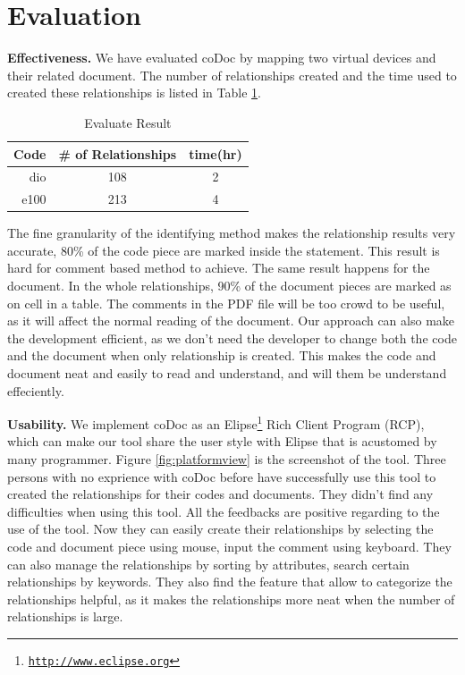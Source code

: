 \documentclass[11pt,letterpaper,oneside]{article}
\begin{document}
\section{Evaluation}
\label{sec:evaluation}
\textbf{Effectiveness.} We have evaluated coDoc by mapping two virtual devices and their related document.
The number of relationships created and the time used to created these relationships is listed in Table \ref{table:evaluate}.

\begin{table}[th]
\caption{Evaluate Result}
\centering
\begin{tabular}{rcc}
\hline
Code & \# of Relationships & time(hr) \\
\hline
dio & 108 & 2 \\
e100  & 213 & 4\\
\hline
\end{tabular}
\label{table:evaluate}
\end{table}

The fine granularity of the identifying method makes the relationship results very accurate, 
80\% of the code piece are marked inside the statement.
This result is hard for comment based method to achieve.
The same result happens for the document.
In the whole relationships, 
90\% of the document pieces are marked as on cell in a table.
The comments in the PDF file will be too crowd to be useful,
as it will affect the normal reading of the document.
Our approach can also make the development efficient,
as we don't need the developer to change both the code and the document when only relationship is created.
This makes the code and document neat and easily to read and understand,
and will them be understand effeciently.

\noindent \textbf{Usability.} We implement coDoc as an Elipse\footnote{\texttt{\url{http://www.eclipse.org}}} Rich Client Program (RCP), 
which can make our tool share the user style with Elipse that is acustomed by many programmer.
Figure \ref{fig:platformview} is the screenshot of the tool.
Three persons with no exprience with coDoc before have successfully use this tool to created the relationships for their codes and documents.
They didn't find any difficulties when using this tool.
All the feedbacks are positive regarding to the use of the tool.
Now they can easily create their relationships by selecting the code and document piece using mouse, input the comment using keyboard.
They can also manage the relationships by sorting by attributes, search certain relationships by keywords.
They also find the feature that allow to categorize the relationships helpful,
as it makes the relationships more neat when the number of relationships is large.
\end{document}
